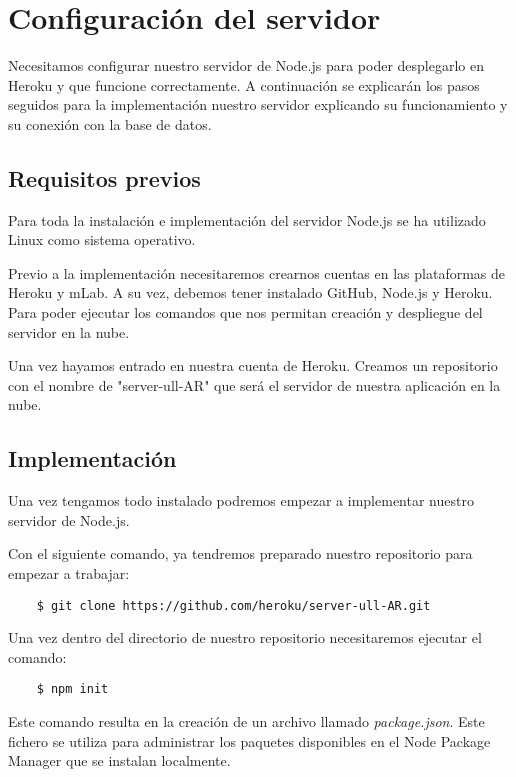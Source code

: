 \section{Configuración del servidor}

Necesitamos configurar nuestro servidor de Node.js para poder desplegarlo en Heroku y que funcione correctamente. A continuación se explicarán los pasos seguidos para la implementación nuestro servidor explicando su funcionamiento y su conexión con la base de datos.

\subsection{Requisitos previos}
Para toda la instalación e implementación del servidor Node.js se ha utilizado Linux como sistema operativo.

Previo a la implementación necesitaremos crearnos cuentas en las plataformas de Heroku y mLab. A su vez, debemos tener instalado GitHub, Node.js y Heroku. Para poder ejecutar los comandos que nos permitan creación y despliegue del servidor en la nube.

Una vez hayamos entrado en nuestra cuenta de Heroku. Creamos un repositorio con el nombre de "server-ull-AR" que será el servidor de nuestra aplicación en la nube.

\subsection{Implementación}

Una vez tengamos todo instalado podremos empezar a implementar nuestro servidor de Node.js.

Con el siguiente comando, ya tendremos preparado nuestro repositorio para empezar a trabajar:

\begin{lstlisting}
    $ git clone https://github.com/heroku/server-ull-AR.git
\end{lstlisting}

Una vez dentro del directorio de nuestro repositorio necesitaremos ejecutar el comando:

\begin{lstlisting}
    $ npm init 
\end{lstlisting}

Este comando resulta en la creación de un archivo llamado \textit{package.json}. Este fichero se utiliza para administrar los paquetes disponibles en el Node Package Manager que se instalan localmente.

